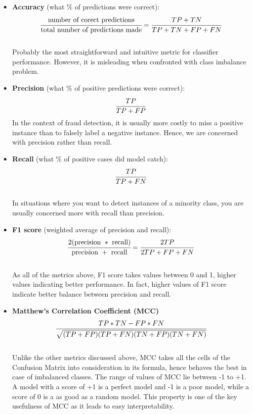     \begin{itemize}
        \item \textbf{Accuracy} (what \% of predictions were correct): $$ \cfrac{\text{number of corect predictions}}{\text{total number of predictions made}} = \cfrac{TP + TN}{TP + TN + FP + FN}$$ \\
        Probably the most straightforward and intuitive metric for classifier performance. However, it is misleading when confronted with class imbalance problem. \\
        
        \item \textbf{Precision} (what \% of positive predictions were correct): $$ \cfrac{TP}{TP + FP}$$ 
        In the context of fraud detection, it is usually more costly to miss a positive instance than to falsely label a negative instance. Hence, we are concerned with precision rather than recall. \\
        
        \item \textbf{Recall} (what \% of positive cases did model catch): $$ \cfrac{TP}{TP + FN}$$ \\
        In situations where you want to detect instances of a minority class, you are usually concerned more with recall than precision. \\
        
        \item \textbf{F1 score} (weighted average of precision and recall): $$ \cfrac{2(\text{precision} \ * \ \text{recall})}{\text{precision} \ + \ \text{recall}} = \cfrac{2TP}{2TP + FP + FN}$$ \\
        As all of the metrics above, F1 score takes values between 0 and 1, higher values indicating better performance. In fact, higher values of F1 score indicate better balance between precision and recall. \\ 
        
        \item \textbf{Matthew's Correlation Coefficient (MCC)} $$ \cfrac{TP * TN - FP * FN}{\sqrt{(TP + FP)(TP + FN)(TN + FP)(TN + FN)}}$$ \\
        Unlike the other metrics discussed above, MCC takes all the cells of the Confusion Matrix into consideration in its formula, hence behaves the best in case of imbalanced classes. The range of values of MCC lie between -1 to +1. A model with a score of +1 is a perfect model and -1 is a poor model, while a score of 0 is a as good as a random model. This property is one of the key usefulness of MCC as it leads to easy interpretability. \\
    \end{itemize}
    

